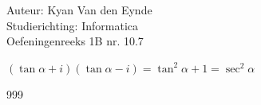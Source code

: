 \documentclass[a4paper]{article}
\begin{document}
  
\noindent \large Auteur: Kyan Van den Eynde \\
\noindent \large Studierichting: Informatica\\
\noindent \large Oefeningenreeks 1B nr. 10.7\\

\medskip

\normalsize

$(\tan \alpha + i)(\tan \alpha - i) = \tan^2 \alpha + 1 = \sec^2 \alpha $\\

\begin{thebibliography}{999}
\end{thebibliography}
\end{document}
